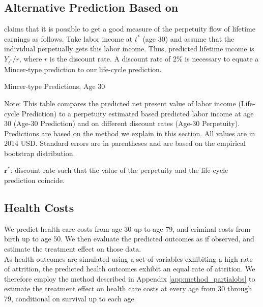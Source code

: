 \subsection{Alternative Prediction Based on \citet{Mincer_1974_schooling}}

\citet{Mincer_1974_schooling} claims that it is possible to get a good measure of the perpetuity flow of lifetime earnings as follows. Take labor income at $t^*$ (age 30) and assume that the individual perpetually gets this labor income. Thus, predicted lifetime income is $Y_{t^*}/r$, where $r$ is the discount rate. A discount rate of 2\% is necessary to equate a Mincer-type prediction to our life-cycle prediction.

\begin{table}[!htbp]
\begin{threeparttable}
\caption{Mincer-type Predictions, Age 30}\label{tab:mincerpred}
\scriptsize
\centering

\begin{tablenotes}
\footnotesize
\item Note: This table compares the predicted net present value of labor income (Life-cycle Prediction) to a perpetuity estimated based predicted labor income at age 30 (Age-30 Prediction) and on different discount rates (Age-30 Perpetuity). Predictions are based on the method we explain in this section. All values are in 2014 USD. Standard errors are in parentheses and are based on the empirical bootstrap distribution.\\
\item $\bm{r^*}$: discount rate such that the value of the perpetuity and the life-cycle prediction coincide.
\end{tablenotes}
\end{threeparttable}
\end{table}

\subsection{Health Costs}

\noindent We predict health care costs from age 30 up to age 79, and criminal costs from birth
up to age 50. We then evaluate the predicted outcomes as if observed, and estimate the
treatment effect on those data.\\

\noindent As health outcomes are simulated using a set of variables exhibiting a high rate of attrition, the
predicted health outcomes exhibit an equal rate of attrition. We therefore employ the method described
in Appendix \ref{app:method_partialobs} to estimate the treatment effect on health care costs at
every age from 30 through 79, conditional on survival up to each age. \\


